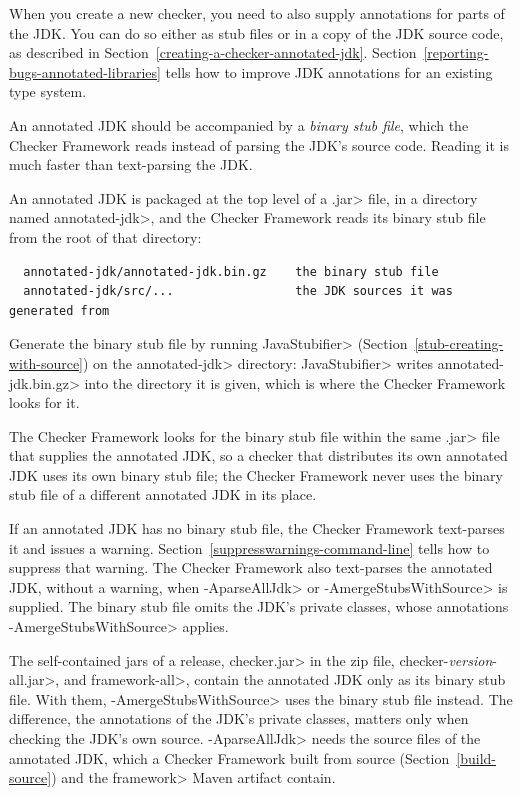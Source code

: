 
When you create a new checker, you need to also supply annotations for
parts of the JDK\@.  You can do so either as stub files or in a copy of the
JDK source code, as described in Section~\ref{creating-a-checker-annotated-jdk}.
Section~\ref{reporting-bugs-annotated-libraries} tells how to improve
JDK annotations for an existing type system.

An annotated JDK should be accompanied by a \emph{binary stub file}, which the
Checker Framework reads instead of parsing the JDK's source code.  Reading it is
much faster than text-parsing the JDK\@.

An annotated JDK is packaged at the top level of a \<.jar> file, in a directory
named \<annotated-jdk>, and the Checker Framework reads its binary stub file
from the root of that directory:
\begin{Verbatim}
  annotated-jdk/annotated-jdk.bin.gz    the binary stub file
  annotated-jdk/src/...                 the JDK sources it was generated from
\end{Verbatim}
Generate the binary stub file by running \<JavaStubifier>
(Section~\ref{stub-creating-with-source}) on the \<annotated-jdk> directory:
\<JavaStubifier> writes \<annotated-jdk.bin.gz> into the directory it is given,
which is where the Checker Framework looks for it.

The Checker Framework looks for the binary stub file within the same \<.jar> file
that supplies the annotated JDK, so a checker that distributes its own annotated
JDK uses its own binary stub file; the Checker Framework never uses the binary
stub file of a different annotated JDK in its place.

If an annotated JDK has no binary stub file, the Checker Framework text-parses
it and issues a warning.  Section~\ref{suppresswarnings-command-line} tells how
to suppress that warning.  The Checker Framework also text-parses the annotated
JDK, without a warning, when \<-AparseAllJdk> or \<-AmergeStubsWithSource> is
supplied.  The binary stub file omits the JDK's private classes, whose
annotations \<-AmergeStubsWithSource> applies.

The self-contained jars of a release, \<checker.jar> in the zip file,
\<checker-\emph{version}-all.jar>, and \<framework-all>, contain the annotated
JDK only as its binary stub file.  With
them, \<-AmergeStubsWithSource> uses the binary stub file instead.  The
difference, the annotations of the JDK's private classes, matters only when
checking the JDK's own source.  \<-AparseAllJdk> needs the source files of the
annotated JDK, which a Checker Framework built from source
(Section~\ref{build-source}) and the \<framework> Maven artifact contain.


